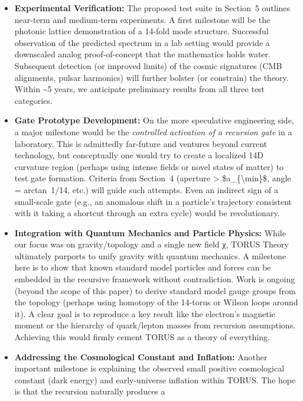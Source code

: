 \documentclass[]{article}
\begin{document}
\begin{itemize}
\item
  \textbf{Experimental Verification:} The proposed test suite in
  Section~5 outlines near-term and medium-term experiments. A first
  milestone will be the photonic lattice demonstration of a 14-fold mode
  structure. Successful observation of the predicted spectrum in a lab
  setting would provide a downscaled analog proof-of-concept that the
  mathematics holds water. Subsequent detection (or improved limits) of
  the cosmic signatures (CMB alignments, pulsar harmonics) will further
  bolster (or constrain) the theory. Within \textasciitilde{}5 years, we
  anticipate preliminary results from all three test categories.
\item
  \textbf{Gate Prototype Development:} On the more speculative
  engineering side, a major milestone would be the \emph{controlled
  activation of a recursion gate} in a laboratory. This is admittedly
  far-future and ventures beyond current technology, but conceptually
  one would try to create a localized 14D curvature region (perhaps
  using intense fields or novel states of matter) to test gate
  formation. Criteria from Section~4 (aperture \textgreater{}
  \$a\_\{\textbackslash{}min\}\$, angle = arctan~1/14, etc.) will guide
  such attempts. Even an indirect sign of a small-scale gate (e.g., an
  anomalous shift in a particle's trajectory consistent with it taking a
  shortcut through an extra cycle) would be revolutionary.
\item
  \textbf{Integration with Quantum Mechanics and Particle Physics:}
  While our focus was on gravity/topology and a single new field χ,
  TORUS Theory ultimately purports to unify gravity with quantum
  mechanics. A milestone here is to show that known standard model
  particles and forces can be embedded in the recursive framework
  without contradiction. Work is ongoing (beyond the scope of this
  paper) to derive standard model gauge groups from the topology
  (perhaps using homotopy of the 14-torus or Wilson loops around it). A
  clear goal is to reproduce a key result like the electron's magnetic
  moment or the hierarchy of quark/lepton masses from recursion
  assumptions. Achieving this would firmly cement TORUS as a theory of
  everything.
\item
  \textbf{Addressing the Cosmological Constant and Inflation:} Another
  important milestone is explaining the observed small positive
  cosmological constant (dark energy) and early-universe inflation
  within TORUS. The hope is that the recursion naturally produces a

\end{itemize}
\end{document}
